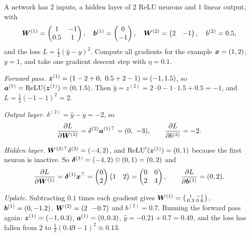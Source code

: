 \begin{example}\label{ex:backprop}
A network has $2$ inputs, a hidden layer of $2$ ReLU neurons and $1$ linear
output, with
\[
  \bm{W}^{(1)} = \begin{pmatrix} 1 & -1\\ 0.5 & 1\end{pmatrix},\quad
  \bm{b}^{(1)} = \begin{pmatrix} 0\\ -1\end{pmatrix},\quad
  \bm{W}^{(2)} = \begin{pmatrix} 2 & -1\end{pmatrix},\quad
  b^{(2)} = 0.5 ,
\]
and the loss $L = \frac12(\hat y - y)^2$. Compute all gradients for the example
$\bm{x} = (1, 2)$, $y = 1$, and take one gradient descent step with $\eta = 0.1$.

\sol \emph{Forward pass.}
$\bm{z}^{(1)} = (1 - 2 + 0,\ 0.5 + 2 - 1) = (-1, 1.5)$, so
$\bm{a}^{(1)} = \operatorname{ReLU}(\bm{z}^{(1)}) = (0, 1.5)$. Then
$\hat y = z^{(2)} = 2\cdot0 - 1\cdot1.5 + 0.5 = -1$, and $L = \frac12(-1 - 1)^2 = 2$.

\emph{Output layer.} $\delta^{(2)} = \hat y - y = -2$, so
\[
  \frac{\partial L}{\partial \bm{W}^{(2)}} = \delta^{(2)}\bm{a}^{(1)\top} = (0,\ -3), \qquad
  \frac{\partial L}{\partial b^{(2)}} = -2 .
\]

\emph{Hidden layer.} $\bm{W}^{(2)\top}\delta^{(2)} = (-4, 2)$, and
$\operatorname{ReLU}'(\bm{z}^{(1)}) = (0, 1)$ because the first neuron is inactive. So
$\bm{\delta}^{(1)} = (-4, 2) \odot (0, 1) = (0, 2)$ and
\[
  \frac{\partial L}{\partial \bm{W}^{(1)}} = \bm{\delta}^{(1)}\bm{x}^\top
  = \begin{pmatrix} 0\\ 2\end{pmatrix}\begin{pmatrix} 1 & 2\end{pmatrix}
  = \begin{pmatrix} 0 & 0\\ 2 & 4\end{pmatrix}, \qquad
  \frac{\partial L}{\partial \bm{b}^{(1)}} = (0, 2).
\]

\emph{Update.} Subtracting $0.1$ times each gradient gives
$\bm{W}^{(1)} = \left(\begin{smallmatrix} 1 & -1\\ 0.3 & 0.6\end{smallmatrix}\right)$,
$\bm{b}^{(1)} = (0, -1.2)$, $\bm{W}^{(2)} = (2\ \ {-0.7})$ and $b^{(2)} = 0.7$. Running the
forward pass again: $\bm{z}^{(1)} = (-1, 0.3)$, $\bm{a}^{(1)} = (0, 0.3)$,
$\hat y = -0.21 + 0.7 = 0.49$, and the loss has fallen from $2$ to
$\frac12(0.49 - 1)^2 \approx 0.13$.
\end{example}

